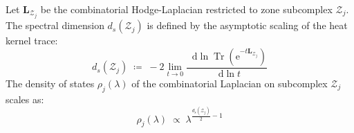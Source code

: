 \documentclass[
    12pt,
    a4paper,
    headings=normal,
    twoside=false,
    open=any,
    parskip=half
]{scrbook}
\newcommand{\diff}{\mathop{}\!\mathrm{d}}
\newcommand{\eu}{\mathrm{e}}
\begin{document}
\begin{physdefinition}\label{def:ch3_graph_spectral_dimension}
Let $\mathbf{L}_{\mathcal{Z}_j}$ be the combinatorial Hodge-Laplacian restricted to zone subcomplex $\mathcal{Z}_j$. The spectral dimension $d_s(\mathcal{Z}_j)$ is defined by the asymptotic scaling of the heat kernel trace:
\begin{equation}
d_s\left( \mathcal{Z}_j \right) \;\coloneqq\; -2 \lim_{t \to 0} \frac{\diff \ln \operatorname{Tr}\left( \eu^{-t \mathbf{L}_{\mathcal{Z}_j}} \right)}{\diff \ln t}
\label{eq:ch3_spectral_dimension_def}
\end{equation}
The density of states $\rho_j(\lambda)$ of the combinatorial Laplacian on subcomplex $\mathcal{Z}_j$ scales as:
\begin{equation}
\rho_j(\lambda) \;\propto\; \lambda^{\frac{d_s(\mathcal{Z}_j)}{2} - 1}
\label{eq:ch3_density_of_states_scaling}
\end{equation}
\end{physdefinition}
\end{document}
